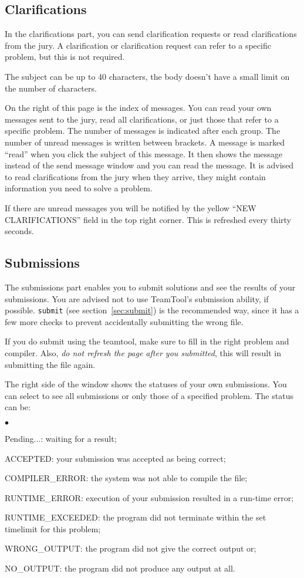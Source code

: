 \documentclass[a4paper,12pt]{article}
\newcommand{\cmd}[1]{\texttt{#1}}
\newenvironment{citemize}
  {\begin{list}{$\bullet$}{\topsep 0cm \itemsep 0cm}}
  {\end{list}}
\begin{document}
\subsection{Clarifications}

In the clarifications part, you can send clarification requests or read
clarifications from the jury. A clarification or clarification request can
refer to a specific problem, but this is not required.

The subject can be up to 40 characters, the body doesn't have a small
limit on the number of characters.

On the right of this page is the index of messages. You can read your own
messages sent to the jury, read all clarifications, or just those that refer
to a specific problem. The number of messages is indicated after each group.
The number of unread messages is written between brackets. A message is
marked ``read'' when you click the subject of this message. It then shows
the message instead of the send message window and you can read the message.
It is advised to read clarifications from the jury when they arrive, they
might contain information you need to solve a problem.

If there are unread messages you will be notified by the yellow ``NEW
CLARIFICATIONS'' field in the top right corner. This is refreshed every
thirty seconds.

\subsection{Submissions}

The submissions part enables you to submit solutions and see the results of
your submissions. You are advised not to use TeamTool's submission ability,
if possible. \cmd{submit} (see section~\ref{sec:submit}) is the recommended
way, since it has a few more checks to prevent accidentally submitting the
wrong file.

If you do submit using the teamtool, make sure to fill in the right problem
and compiler. Also, \emph{do not refresh the page after you submitted}, this
will result in submitting the file again.

The right side of the window shows the statuses of your own submissions. You
can select to see all submissions or only those of a specified problem. The
status can be:

\begin{citemize}
\item[Pending...:] waiting for a result;
\item[ACCEPTED:] your submission was accepted as being correct;
\item[COMPILER\_ERROR:] the system was not able to compile the file;
\item[RUNTIME\_ERROR:] execution of your submission resulted in a run-time
error;
\item[RUNTIME\_EXCEEDED:] the program did not terminate within the set
timelimit for this problem;
\item[WRONG\_OUTPUT:] the program did not give the correct output or;
\item[NO\_OUTPUT:] the program did not produce any output at all.
\end{citemize}
\end{document}
